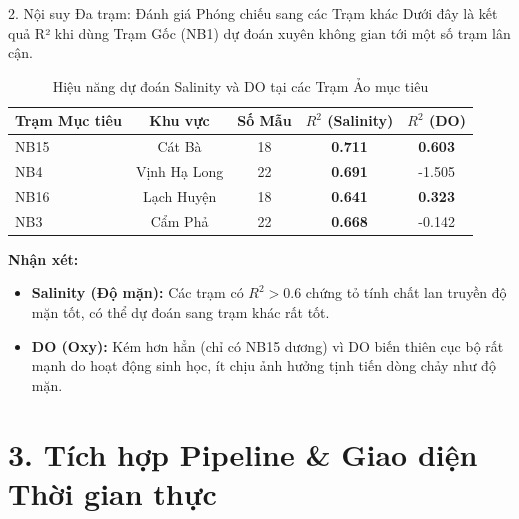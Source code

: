 \documentclass[aspectratio=169]{beamer}
\begin{document}
\begin{frame}{2. Nội suy Đa trạm: Đánh giá Phóng chiếu sang các Trạm khác}
    Dưới đây là kết quả R² khi dùng Trạm Gốc (NB1) dự đoán xuyên không gian tới một số trạm lân cận.
    
    \vspace{0.2cm}
    \begin{table}[]
        \centering
        \caption{Hiệu năng dự đoán Salinity và DO tại các Trạm Ảo mục tiêu}
        \renewcommand{\arraystretch}{1.2}
        \begin{tabular}{lcccc}
            \toprule
            \textbf{Trạm Mục tiêu} & \textbf{Khu vực} & \textbf{Số Mẫu} & \textbf{$R^2$ (Salinity)} & \textbf{$R^2$ (DO)} \\
            \midrule
            NB15 & Cát Bà & 18 & \textbf{0.711} & \textbf{0.603} \\
            NB4 & Vịnh Hạ Long & 22 & \textbf{0.691} & -1.505 \\
            NB16 & Lạch Huyện & 18 & \textbf{0.641} & \textbf{0.323} \\
            NB3 & Cẩm Phả & 22 & \textbf{0.668} & -0.142 \\
            \bottomrule
        \end{tabular}
    \end{table}

    \textbf{Nhận xét:}
    \begin{itemize}
        \item \textbf{Salinity (Độ mặn):} Các trạm có $R^2 > 0.6$ chứng tỏ tính chất lan truyền độ mặn tốt, có thể dự đoán sang trạm khác rất tốt.
        \item \textbf{DO (Oxy):} Kém hơn hẳn (chỉ có NB15 dương) vì DO biến thiên cục bộ rất mạnh do hoạt động sinh học, ít chịu ảnh hưởng tịnh tiến dòng chảy như độ mặn.
    \end{itemize}
\end{frame}

\section{3. Tích hợp Pipeline \& Giao diện Thời gian thực}
\end{document}
